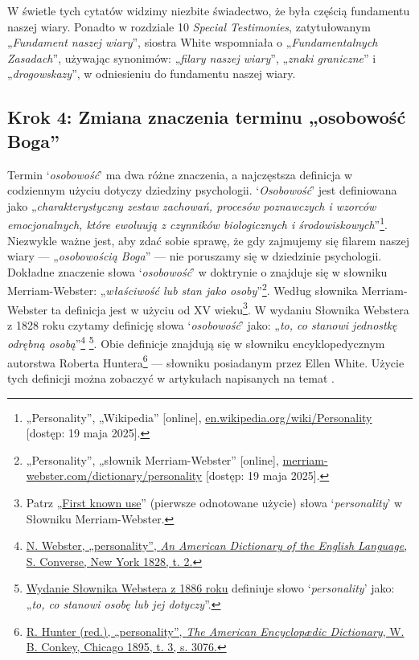 W świetle tych cytatów widzimy niezbite świadectwo, że  była częścią fundamentu naszej wiary. Ponadto w rozdziale 10 \textit{Special Testimonies}, zatytułowanym „\textit{Fundament naszej wiary}”, siostra White wspomniała o „\textit{Fundamentalnych Zasadach}”, używając synonimów: „\textit{filary naszej wiary}”, „\textit{znaki graniczne}” i „\textit{drogowskazy}”, w odniesieniu do fundamentu naszej wiary.

\subsection*{Krok 4: Zmiana znaczenia terminu „osobowość Boga”}

Termin ‘\textit{osobowość}’ ma dwa różne znaczenia, a najczęstsza definicja w codziennym użyciu dotyczy dziedziny psychologii. ‘\textit{Osobowość}’ jest definiowana jako „\textit{charakterystyczny zestaw zachowań, procesów poznawczych i wzorców emocjonalnych, które ewoluują z czynników biologicznych i środowiskowych}”\footnote{„Personality”, „Wikipedia” [online], \href{https://en.wikipedia.org/wiki/Personality}{en.wikipedia.org/wiki/Personality} [dostęp: 19 maja 2025].}. Niezwykle ważne jest, aby zdać sobie sprawę, że gdy zajmujemy się filarem naszej wiary — „\textit{osobowością Boga}” — nie poruszamy się w dziedzinie psychologii. Dokładne znaczenie słowa ‘\textit{osobowość}’ w doktrynie o  znajduje się w słowniku Merriam-Webster: „\textit{właściwość lub stan jako osoby}”\footnote{„Personality”, „słownik Merriam-Webster” [online], \href{https://www.merriam-webster.com/dictionary/personality}{merriam-webster.com/dictionary/personality} [dostęp: 19 maja 2025].}. Według słownika Merriam-Webster ta definicja jest w użyciu od XV wieku\footnote{Patrz „\href{https://www.merriam-webster.com/dictionary/personality\#word-history}{First known use}” (pierwsze odnotowane użycie) słowa ‘\textit{personality}’ w Słowniku Merriam-Webster.}. W wydaniu Słownika Webstera z 1828 roku czytamy definicję słowa ‘\textit{osobowość}’ jako: „\textit{to, co stanowi jednostkę odrębną osobą}”\footnote{\href{https://archive.org/details/americandictiona02websrich/page/272/mode/2up}{N. Webster, „personality”, \textit{An American Dictionary of the English Language}, S. Converse, New York 1828, t. 2.}} \footnote{\href{https://archive.org/details/websterscomplete00webs/page/974/mode/2up}{Wydanie Słownika Webstera z 1886 roku} definiuje słowo ‘\textit{personality}’ jako: „\textit{to, co stanowi osobę lub jej dotyczy}”.}. Obie definicje znajdują się w słowniku encyklopedycznym autorstwa Roberta Huntera\footnote{\href{https://babel.hathitrust.org/cgi/pt?id=mdp.39015050663213&view=1up&seq=780}{R. Hunter (red.), „personality”, \textit{The American Encyclopædic Dictionary}, W. B. Conkey, Chicago 1895, t. 3, s. 3076.}} — słowniku posiadanym przez Ellen White. Użycie tych definicji można zobaczyć w artykułach napisanych na temat .

